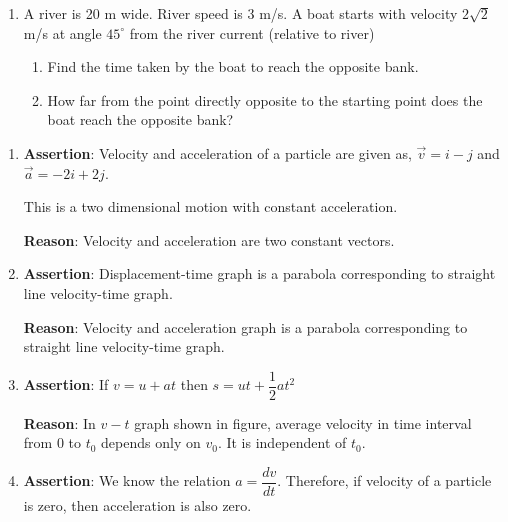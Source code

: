\documentclass{article}
\renewcommand{\frac}[2]{\dfrac{#1}{#2}}
\begin{document}
\begin{enumerate}
    \item A river is 20 m wide. River speed is 3 m/s. A boat starts with velocity $2\sqrt{2}$ m/s at angle $45^\circ$ from the river current (relative to river)
    \begin{enumerate}
      \item Find the time taken by the boat to reach the opposite bank.
      \item How far from the point directly opposite to the starting point does the boat reach the opposite bank?
    \end{enumerate}
  \end{enumerate}



  \begin{enumerate}
    \item \textbf{Assertion}: Velocity and acceleration of a particle are given as, $\vec{v} = i - j$ and $\vec{a} = -2i + 2j$.
    
    This is a two dimensional motion with constant acceleration.
    
    \textbf{Reason}: Velocity and acceleration are two constant vectors.
    
    \item \textbf{Assertion}: Displacement-time graph is a parabola corresponding to straight line velocity-time graph.
    
    \textbf{Reason}: Velocity and acceleration graph is a parabola corresponding to straight line velocity-time graph.
    
    \item \textbf{Assertion}: If $v = u + at$ then $s = ut + \frac{1}{2}at^2$
    
    \textbf{Reason}: In $v-t$ graph shown in figure, average velocity in time interval from 0 to $t_0$ depends only on $v_0$. It is independent of $t_0$.
    
    
    \item \textbf{Assertion}: We know the relation $a = \frac{dv}{dt}$. Therefore, if velocity of a particle is zero, then acceleration is also zero.
    

\end{enumerate}
\end{document}
